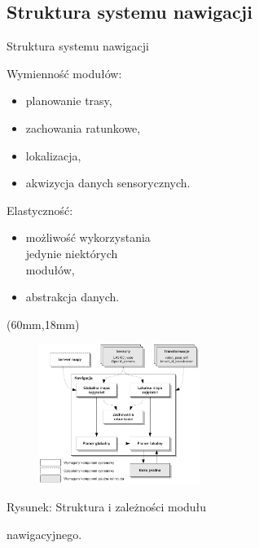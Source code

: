 \documentclass[xcolor=x11names,compress]{beamer}
\renewcommand{\(}{\begin{columns}}
\renewcommand{\)}{\end{columns}}
\newcommand{\<}[1]{\begin{column}{#1}}
\renewcommand{\>}{\end{column}}
\begin{document}
\subsection{Struktura systemu nawigacji}

\begin{frame}{Struktura systemu nawigacji}

\alert{Wymienność modułów:}
\begin{itemize}
\item planowanie trasy,
\item zachowania ratunkowe,
\item lokalizacja,
\item akwizycja danych sensorycznych.
\end{itemize}

\vspace{.5cm}

\alert{Elastyczność:}
\begin{itemize}
\item możliwość wykorzystania\\jedynie niektórych\\modułów,
\item abstrakcja danych.
\end{itemize}

\begin{textblock*}{70mm}(60mm,18mm)%
    \begin{minipage}[c]{70mm}%
		\begin{figure}[h!]
		\includegraphics[width=5.2cm]{../MSc/img/diag_move_base}
		\end{figure}
		\hspace{1cm}\scriptsize \alert{Rysunek:} Struktura i zależności modułu
		
		\hspace{1cm}nawigacyjnego.
    \end{minipage}
\end{textblock*}

\end{frame}
\end{document}
